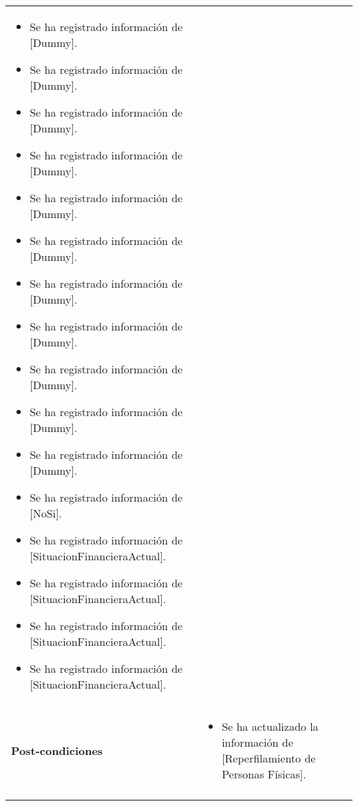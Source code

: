 \begin{tabular}{ p{3.5cm} p{11.5cm} }
\begin{minipage}[t]{0.6\textwidth}
\begin{itemize}[noitemsep,nolistsep]
				\item Se ha registrado informaci\'on de [Dummy].
				\item Se ha registrado informaci\'on de [Dummy].
				\item Se ha registrado informaci\'on de [Dummy].
				\item Se ha registrado informaci\'on de [Dummy].
				\item Se ha registrado informaci\'on de [Dummy].
				\item Se ha registrado informaci\'on de [Dummy].
				\item Se ha registrado informaci\'on de [Dummy].
				\item Se ha registrado informaci\'on de [Dummy].
				\item Se ha registrado informaci\'on de [Dummy].
				\item Se ha registrado informaci\'on de [Dummy].
				\item Se ha registrado informaci\'on de [Dummy].
				\item Se ha registrado informaci\'on de [NoSi].
				\item Se ha registrado informaci\'on de [SituacionFinancieraActual].
				\item Se ha registrado informaci\'on de [SituacionFinancieraActual].
				\item Se ha registrado informaci\'on de [SituacionFinancieraActual].
				\item Se ha registrado informaci\'on de [SituacionFinancieraActual].
			\end{itemize}
			\end{minipage} \\
		\textbf{Post-condiciones} &
			\begin{minipage}[t]{0.6\textwidth}
			\begin{itemize}[noitemsep,nolistsep]
			\setlength{\itemindent}{-.5cm}
				\item Se ha actualizado la informaci\'on de [Reperfilamiento de Personas F\'isicas].
			\end{itemize}
			\end{minipage} \\
		\\
	\end{tabular}
	
